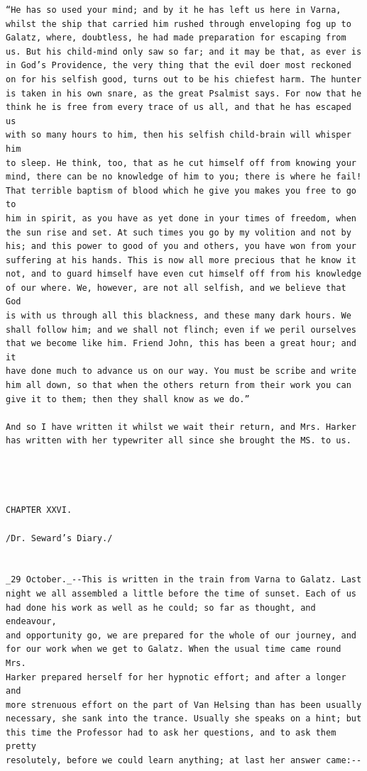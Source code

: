 \documentclass{article}
\begin{document}
\begin{verbatim}
“He has so used your mind; and by it he has left us here in Varna,
whilst the ship that carried him rushed through enveloping fog up to
Galatz, where, doubtless, he had made preparation for escaping from
us. But his child-mind only saw so far; and it may be that, as ever is
in God’s Providence, the very thing that the evil doer most reckoned
on for his selfish good, turns out to be his chiefest harm. The hunter
is taken in his own snare, as the great Psalmist says. For now that he
think he is free from every trace of us all, and that he has escaped us
with so many hours to him, then his selfish child-brain will whisper him
to sleep. He think, too, that as he cut himself off from knowing your
mind, there can be no knowledge of him to you; there is where he fail!
That terrible baptism of blood which he give you makes you free to go to
him in spirit, as you have as yet done in your times of freedom, when
the sun rise and set. At such times you go by my volition and not by
his; and this power to good of you and others, you have won from your
suffering at his hands. This is now all more precious that he know it
not, and to guard himself have even cut himself off from his knowledge
of our where. We, however, are not all selfish, and we believe that God
is with us through all this blackness, and these many dark hours. We
shall follow him; and we shall not flinch; even if we peril ourselves
that we become like him. Friend John, this has been a great hour; and it
have done much to advance us on our way. You must be scribe and write
him all down, so that when the others return from their work you can
give it to them; then they shall know as we do.”

And so I have written it whilst we wait their return, and Mrs. Harker
has written with her typewriter all since she brought the MS. to us.




CHAPTER XXVI.

/Dr. Seward’s Diary./


_29 October._--This is written in the train from Varna to Galatz. Last
night we all assembled a little before the time of sunset. Each of us
had done his work as well as he could; so far as thought, and endeavour,
and opportunity go, we are prepared for the whole of our journey, and
for our work when we get to Galatz. When the usual time came round Mrs.
Harker prepared herself for her hypnotic effort; and after a longer and
more strenuous effort on the part of Van Helsing than has been usually
necessary, she sank into the trance. Usually she speaks on a hint; but
this time the Professor had to ask her questions, and to ask them pretty
resolutely, before we could learn anything; at last her answer came:--


\end{verbatim}
\end{document}

